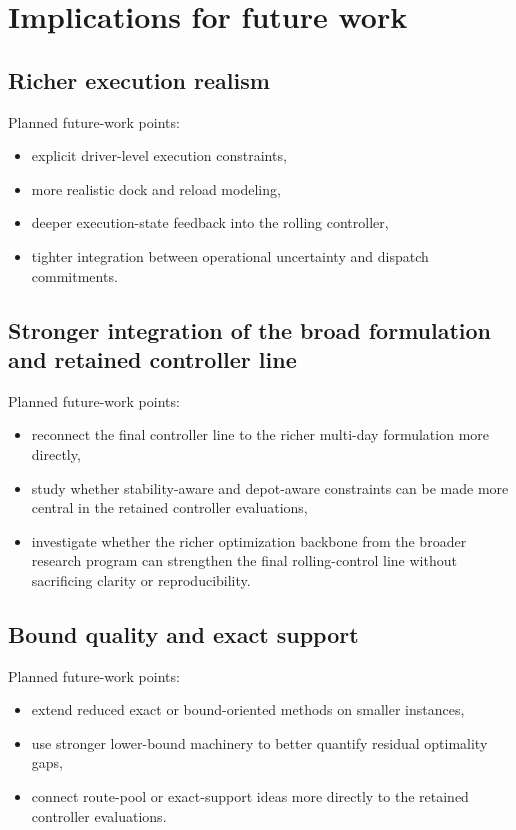 \section{Implications for future work}

\subsection{Richer execution realism}

Planned future-work points:
\begin{itemize}
    \item explicit driver-level execution constraints,
    \item more realistic dock and reload modeling,
    \item deeper execution-state feedback into the rolling controller,
    \item tighter integration between operational uncertainty and dispatch commitments.
\end{itemize}

\subsection{Stronger integration of the broad formulation and retained controller line}

Planned future-work points:
\begin{itemize}
    \item reconnect the final controller line to the richer multi-day formulation more directly,
    \item study whether stability-aware and depot-aware constraints can be made more central in the retained controller evaluations,
    \item investigate whether the richer optimization backbone from the broader research program can strengthen the final rolling-control line without sacrificing clarity or reproducibility.
\end{itemize}

\subsection{Bound quality and exact support}

Planned future-work points:
\begin{itemize}
    \item extend reduced exact or bound-oriented methods on smaller instances,
    \item use stronger lower-bound machinery to better quantify residual optimality gaps,
    \item connect route-pool or exact-support ideas more directly to the retained controller evaluations.
\end{itemize}

